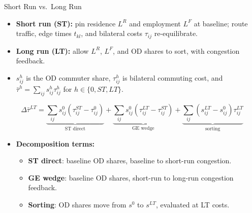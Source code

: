 \documentclass[11pt,aspectratio=169]{beamer}
\begin{document}
\begin{frame}{Short Run vs.\ Long Run}
\small
\begin{itemize}
  \item \textbf{Short run (ST):} pin residence $L^R$ and employment $L^F$ at baseline; route traffic, edge times $t_{kl}$, and bilateral costs $\tau_{ij}$ re-equilibrate.
  \item \textbf{Long run (LT):} allow $L^R$, $L^F$, and OD shares to sort, with congestion feedback.
  \item $s_{ij}^h$ is the OD commuter share, $\tau_{ij}^h$ is bilateral commuting cost, and $\bar\tau^h=\sum_{ij}s_{ij}^h\tau_{ij}^h$ for $h\in\{0,ST,LT\}$.
\end{itemize}
\vspace{-0.5em}
{\footnotesize
  \begin{equation}
    \Delta\bar\tau^{LT}=
    \underbrace{\textstyle\sum_{ij}s_{ij}^0(\tau_{ij}^{ST}\!-\tau_{ij}^0)}_{\text{ST direct}}
    +\underbrace{\textstyle\sum_{ij}s_{ij}^0(\tau_{ij}^{LT}\!-\tau_{ij}^{ST})}_{\text{GE wedge}}
    +\underbrace{\textstyle\sum_{ij}(s_{ij}^{LT}\!-s_{ij}^0)\tau_{ij}^{LT}}_{\text{sorting}}
  \end{equation}
}
\vspace{-1.0em}
\begin{itemize}\footnotesize
  \item \textbf{Decomposition terms:}
  \begin{itemize}\scriptsize
    \item \textbf{ST direct}: baseline OD shares, baseline to short-run congestion.
    \item \textbf{GE wedge}: baseline OD shares, short-run to long-run congestion feedback.
    \item \textbf{Sorting}: OD shares move from $s^0$ to $s^{LT}$, evaluated at LT costs.
  \end{itemize}
\end{itemize}
\end{frame}
\end{document}
